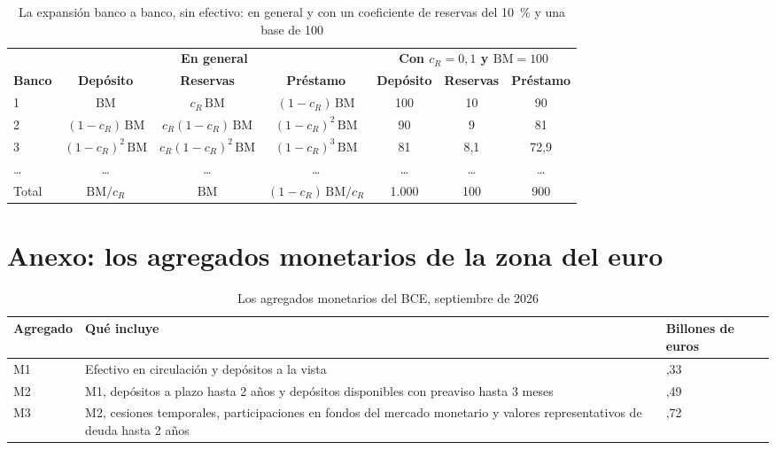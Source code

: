 \documentclass[11pt]{article}
\begin{document}
\begin{table}[H]
\centering
\caption{La expansión banco a banco, sin efectivo: en general y con un coeficiente de reservas del 10~\% y una base de 100}\label{tab:expansion}
\small
\begin{tabular}{lcccccc}
\toprule
\rowcolor{tceeazulpalido} & \multicolumn{3}{c}{\textbf{En general}} & \multicolumn{3}{c}{\textbf{Con $c_R=0{,}1$ y $\mathrm{BM}=100$}} \\
\rowcolor{tceeazulpalido}\textbf{Banco} & \textbf{Depósito} & \textbf{Reservas} & \textbf{Préstamo} & \textbf{Depósito} & \textbf{Reservas} & \textbf{Préstamo} \\
\midrule
1 & $\mathrm{BM}$ & $c_R\,\mathrm{BM}$ & $(1-c_R)\,\mathrm{BM}$ & 100 & 10 & 90 \\
2 & $(1-c_R)\,\mathrm{BM}$ & $c_R(1-c_R)\,\mathrm{BM}$ & $(1-c_R)^2\,\mathrm{BM}$ & 90 & 9 & 81 \\
3 & $(1-c_R)^2\,\mathrm{BM}$ & $c_R(1-c_R)^2\,\mathrm{BM}$ & $(1-c_R)^3\,\mathrm{BM}$ & 81 & 8,1 & 72,9 \\
\dots & \dots & \dots & \dots & \dots & \dots & \dots \\
Total & $\mathrm{BM}/c_R$ & $\mathrm{BM}$ & $(1-c_R)\,\mathrm{BM}/c_R$ & 1.000 & 100 & 900 \\
\bottomrule
\end{tabular}
\end{table}

\section{Anexo: los agregados monetarios de la zona del euro}\label{anexo:agregados}

\begin{table}[H]
\centering
\caption{Los agregados monetarios del BCE, septiembre de 2026}\label{tab:agregados}
\small
\begin{tabular}{>{\raggedright\arraybackslash}p{}>{\raggedright\arraybackslash}p{}>{\centering\arraybackslash}p{}}
\toprule
\rowcolor{tceeazulpalido}\textbf{Agregado} & \textbf{Qué incluye} & \textbf{Billones de euros} \\
\midrule
M1 & Efectivo en circulación y depósitos a la vista & 11,33 \\
M2 & M1, depósitos a plazo hasta 2 años y depósitos disponibles con preaviso hasta 3 meses & 16,49 \\
M3 & M2, cesiones temporales, participaciones en fondos del mercado monetario y valores representativos de deuda hasta 2 años & 17,72 \\
\bottomrule
\end{tabular}
\end{table}
\end{document}
